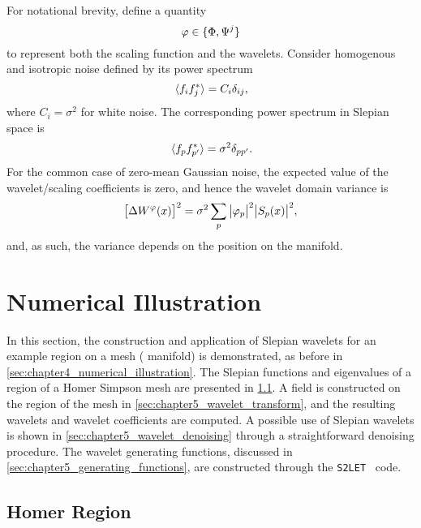 For notational brevity, define a quantity
%
\begin{equation}
	\varphi \in \set{\Phi,\Psi^{j}}
\end{equation}
%
to represent both the scaling function and the wavelets.
Consider homogenous and isotropic noise defined by its power spectrum
%
\begin{equation}
	\expval*{f_{i} \conj{f_{j}}}
	= C_{i} \delta_{i j},
\end{equation}
%
where \(C_{i} = \sigma^{2}\) for white noise.
The corresponding power spectrum in Slepian space is
%
\begin{equation}
	\expval*{\slepian{f} \conj{\slepian[']{f}}}
	= \sigma^{2} \delta_{pp'}.
\end{equation}
%
For the common case of zero-mean Gaussian noise, the expected value of the wavelet/scaling coefficients is zero, and hence the wavelet domain variance is
%
\begin{equation}
	\variance{\mesh{W^{\varphi}}}
	= \sigma^{2} \slepianSum \abs{\slepian{\varphi}}^{2} \abs{\mesh{\slepian{S}}}^{2},
\end{equation}
%
and, as such, the variance depends on the position on the manifold.

\section{Numerical Illustration}\label{sec:chapter5_numerical_illustration}

In this section, the construction and application of Slepian wavelets for an example region on a mesh (\cf{} manifold) is demonstrated, as before in \cref{sec:chapter4_numerical_illustration}.
The Slepian functions and eigenvalues of a region of a Homer Simpson mesh are presented in \cref{sec:chapter5_homer_region}.
A field is constructed on the region of the mesh in \cref{sec:chapter5_wavelet_transform}, and the resulting wavelets and wavelet coefficients are computed.
A possible use of Slepian wavelets is shown in \cref{sec:chapter5_wavelet_denoising} through a straightforward denoising procedure.
The wavelet generating functions, discussed in \cref{sec:chapter5_generating_functions}, are constructed through the \texttt{S2LET}~\cite{Leistedt2013} code.

\subsection{Homer Region}\label{sec:chapter5_homer_region}

